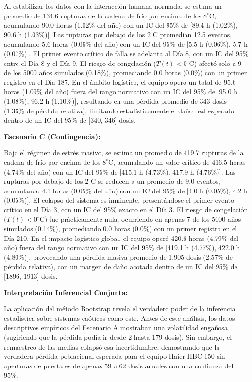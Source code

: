 \documentclass[
  spanish,
  us-letterpaper,
]{scrreprt}
\numberwithin{equation}{section}
\theoremstyle{plain}
\theoremstyle{plain}
\theoremstyle{definition}
\theoremstyle{plain}
\theoremstyle{remark}
\begin{document}
Al estabilizar los datos con la interacción humana normada, se estima un
promedio de 134.6 rupturas de la cadena de frío por encima de los
\(8^\circ\text{C}\), acumulando 90.0 horas (1.02\% del año) con un IC
del 95\% de {[}89.4 h (1.02\%), 90.6 h (1.03\%){]}. Las rupturas por
debajo de los \(2^\circ\text{C}\) promedian 12.5 eventos, acumulando 5.6
horas (0.06\% del año) con un IC del 95\% de {[}5.5 h (0.06\%), 5.7 h
(0.07\%){]}. El primer evento crítico de falla se adelanta al Día 8, con
un IC del 95\% entre el Día 8 y el Día 9. El riesgo de congelación
(\(T(t)<0^\circ\text{C}\)) afectó solo a 9 de los 5000 años simulados
(0.18\%), promediando 0.0 horas (0.0\%) con un primer registro en el Día
187. En el ámbito logístico, el equipo operó un total de 95.6 horas
(1.09\% del año) fuera del rango normativo con un IC del 95\% de {[}95.0
h (1.08\%), 96.2 h (1.10\%){]}, resultando en una pérdida promedio de
343 dosis (1.36\% de pérdida relativa), limitando estadísticamente el
daño real esperado dentro de un IC del 95\% de {[}340, 346{]} dosis.

\textbf{Escenario C (Contingencia):}

Bajo el régimen de estrés masivo, se estima un promedio de 419.7
rupturas de la cadena de frío por encima de los \(8^\circ\text{C}\),
acumulando un valor crítico de 416.5 horas (4.74\% del año) con un IC
del 95\% de {[}415.1 h (4.73\%), 417.9 h (4.76\%){]}. Las rupturas por
debajo de los \(2^\circ\text{C}\) se reducen a un promedio de 9.0
eventos, acumulando 4.1 horas (0.05\% del año) con un IC del 95\% de
{[}4.0 h (0.05\%), 4.2 h (0.05\%){]}. El colapso del sistema es
inminente, presentándose el primer evento crítico en el Día 3, con un IC
del 95\% exacto en el Día 3. El riesgo de congelación
(\(T(t)<0^\circ\text{C}\)) fue prácticamente nula, ocurriendo en apenas
7 de los 5000 años simulados (0.14\%), promediando 0.0 horas (0.0\%) con
un primer registro en el Día 210. En el impacto logístico global, el
equipo operó 420.6 horas (4.79\% del año) fuera del rango normativo con
un IC del 95\% de {[}419.1 h (4.77\%), 422.0 h (4.80\%){]}, provocando
una pérdida masiva promedio de 1,905 dosis (2.57\% de pérdida relativa),
con un margen de daño acotado dentro de un IC del 95\% de {[}1896,
1913{]} dosis.

\textbf{Interpretación Inferencial Conjunta:}

La aplicación del método Bootstrap revela el verdadero poder de la
inferencia estadística sobre sistemas caóticos como este. Antes de este
análisis, los datos descriptivos empíricos del Escenario A mostraban una
volatilidad engañosa (sugiriendo que la pérdida podía ir desde 2 hasta
179 dosis). Sin embargo, el remuestreo de las medias colapsó esa
incertidumbre, demostrando que la verdadera pérdida poblacional esperada
para el equipo Haier HBC-150 sin aperturas de puerta es de apenas 59 a
62 dosis anuales con una confianza del 95\%.
\end{document}
